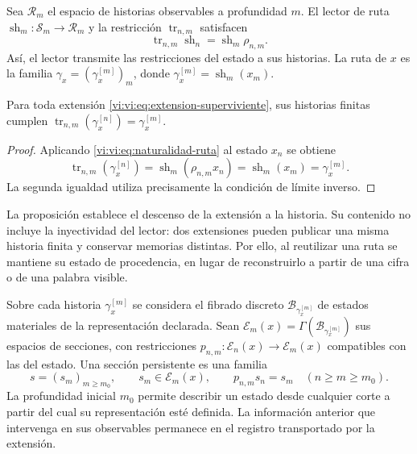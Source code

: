 Sea $\mathcal R_m$ el espacio de historias observables a profundidad $m$.
El lector de ruta $\operatorname{sh}_m:\mathcal S_m\to\mathcal R_m$
y la restricción $\operatorname{tr}_{n,m}$ satisfacen
\begin{equation}
 \operatorname{tr}_{n,m}\operatorname{sh}_n
 =\operatorname{sh}_m\rho_{n,m}.
 \label{vi:vi:eq:naturalidad-ruta}
\end{equation}
Así, el lector transmite las restricciones del estado a sus historias.
La ruta de $x$ es la familia
$\gamma_x=(\gamma_x^{[m]})_m$, donde
$\gamma_x^{[m]}=\operatorname{sh}_m(x_m)$.

\begin{proposition}
\label{vi:vi:prop:historia-compatible}
Para toda extensión \eqref{vi:vi:eq:extension-superviviente}, sus historias
finitas cumplen
$\operatorname{tr}_{n,m}(\gamma_x^{[n]})=\gamma_x^{[m]}$.
\end{proposition}
\begin{proof}
Aplicando \eqref{vi:vi:eq:naturalidad-ruta} al estado $x_n$ se obtiene
\[
 \operatorname{tr}_{n,m}(\gamma_x^{[n]})
 =\operatorname{sh}_m(\rho_{n,m}x_n)
 =\operatorname{sh}_m(x_m)=\gamma_x^{[m]}.
\]
La segunda igualdad utiliza precisamente la condición de límite inverso.
\end{proof}

La proposición establece el descenso de la extensión a la historia.
Su contenido no incluye la inyectividad del lector: dos extensiones
pueden publicar una misma historia finita y conservar memorias distintas.
Por ello, al reutilizar una ruta se mantiene su estado de procedencia,
en lugar de reconstruirlo a partir de una cifra o de una palabra visible.

Sobre cada historia $\gamma_x^{[m]}$ se considera el fibrado discreto
$\mathcal B_{\gamma_x^{[m]}}$ de estados materiales de la representación
declarada. Sean
$\mathscr E_m(x)=\Gamma(\mathcal B_{\gamma_x^{[m]}})$ sus espacios
de secciones, con restricciones
$p_{n,m}:\mathscr E_n(x)\to\mathscr E_m(x)$ compatibles con las
del estado. Una sección persistente es una familia
\begin{equation}
 s=(s_m)_{m\geq m_0},\qquad s_m\in\mathscr E_m(x),\qquad
 p_{n,m}s_n=s_m\quad(n\geq m\geq m_0).
 \label{vi:vi:eq:seccion-persistente}
\end{equation}
La profundidad inicial $m_0$ permite describir un estado desde cualquier
corte a partir del cual su representación esté definida. La información
anterior que intervenga en sus observables permanece en el registro
transportado por la extensión.

